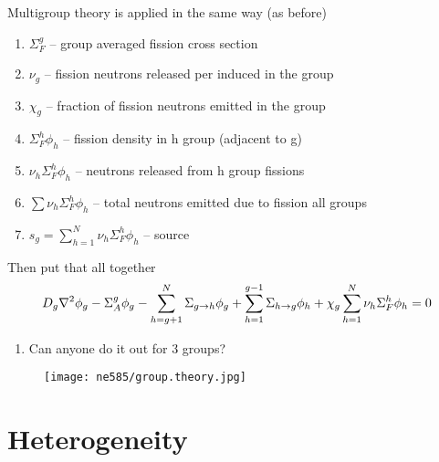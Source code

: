 \documentclass[aspectratio=1610,pdftex,dvipsnames,compress,xcolor={dvipsnames}]{beamer}
\begin{document}
\begin{frame}{Multigroup theory is applied in the same way (as before)}
    \begin{enumerate}[series=outerlist,topsep=0pt,itemsep=21pt,leftmargin=*,label=(\arabic*)]
        \item[]$\Sigma_F^g$ -- group averaged fission cross section
        \item[]$\nu_g$ -- fission neutrons released per induced in the group
        \item[]$\chi_g$ -- fraction of fission neutrons emitted in the group
        \item[]$\Sigma_F^h \phi_h$ -- fission density in h group (adjacent to g)
        \item[]$\nu_h \Sigma_F^h \phi_h$ -- neutrons released from h group fissions
        \item[]$\sum \nu_h \Sigma_F^h \phi_h$ -- total neutrons emitted due to fission all groups
        \item[]$s_g = \sum_{h=1}^N \nu_h \Sigma_F^h \phi_h$ -- source
    \end{enumerate}
\end{frame}


\begin{frame}{Then put that all together}
    \begin{equation}
        \Large
        D_g \nabla^2 \phi_g - \Sigma_A^g \phi_g - \sum_{h=g + 1}^N \Sigma_{g \rightarrow h}\phi_g + \sum_{h=1}^{g-1} \Sigma_{h \rightarrow g} \phi_h + \chi_g \sum_{h=1}^N \nu_h \Sigma_F^h \phi_h = 0
    \end{equation}

    \vspace*{\fill}

    \begin{enumerate}[series=outerlist,topsep=0pt,itemsep=21pt,leftmargin=*,label=(\arabic*)]
        \item[] Can anyone do it out for 3 groups?
    \end{enumerate}
\end{frame}


\begin{frame}{}
    \begin{figure}
        \centering
        \texttt{[image: ne585/group.theory.jpg]}
    \end{figure}
\end{frame}


\section{Heterogeneity}
\end{document}

